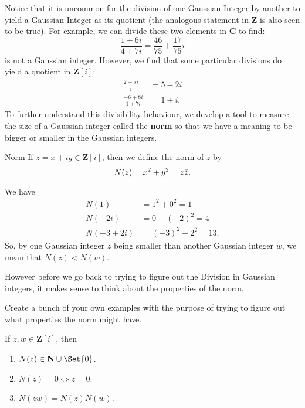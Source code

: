Notice that it is uncommon for the division of one Gaussian Integer by another
to yield a Gaussian Integer as its quotient (the analogous statement in $ \mathbf{Z} $ is also
seen to be true). For example, we can divide these two elements in $ \mathbf{C} $ to find:
\[ \frac{1+6i}{4+7i}=\frac{46}{75}+\frac{17}{75}i \]
is not a Gaussian integer. However, we find that some particular divisions do yield
a quotient in $ \mathbf{Z}[i] $:
\begin{align*}
    \frac{2+5i}{i}     & =5-2i \\
    \frac{-6+8i}{1+7i} & =1+i.
\end{align*}
To further understand this divisibility behaviour, we develop a tool to measure the
size of a Gaussian integer called the \textbf{norm} so that we have a meaning to be bigger
or smaller in the Gaussian integers.
\begin{Definition}{Norm}{}
    If $ z=x+iy\in\mathbf{Z}[i] $, then we define the norm of $ z $ by
    \[ N(z)=x^2+y^2=z\bar{z}. \]
\end{Definition}
\begin{Example}{}{}
    We have
    \begin{align*}
        N(1)     & =1^2+0^2=1      \\
        N(-2i)   & =0+(-2)^2=4     \\
        N(-3+2i) & =(-3)^2+2^2=13.
    \end{align*}
    So, by one Gaussian integer $z$ being smaller than another Gaussian integer $w$,
    we mean that $N (z) < N (w)$.
\end{Example}
However before we go back to trying to figure out the Division in Gaussian
integers, it makes sense to think about the properties of the norm.
\begin{Exercise}{}{}
    Create a bunch of your own examples with the purpose of trying
    to figure out what properties the norm might have.
\end{Exercise}
\begin{Theorem}{}{}
    If $ z,w\in\mathbf{Z}[i] $, then
    \begin{enumerate}[(1)]
        \item $ N(z)\in\mathbf{N}\cup\Set{0} $.
        \item $ N(z)=0\iff z=0 $.
        \item $ N(zw)=N(z)N(w) $.
    \end{enumerate}
\end{Theorem}
